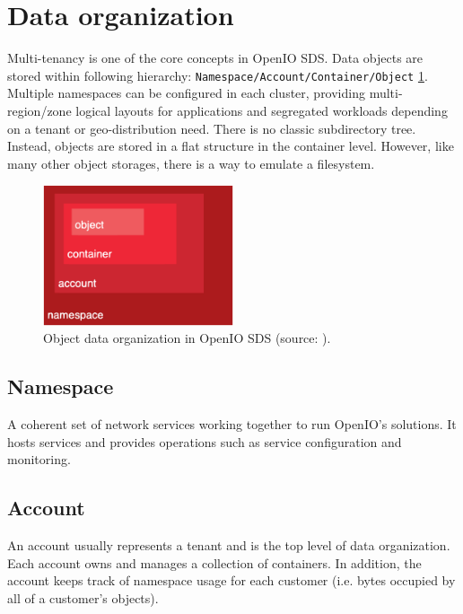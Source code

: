     \section{Data organization}
    Multi-tenancy is one of the core concepts in OpenIO SDS. Data objects are stored within following hierarchy: \texttt{Namespace/Account/Container/Object} \ref{fig:oioDataOrganization}. Multiple namespaces can be configured in each cluster, providing multi-region/zone logical layouts for applications and segregated workloads depending on a tenant or geo-distribution need\cite{oioSdsConcepts}.
    There is no classic subdirectory tree. Instead, objects are stored in a flat structure in the container level. However, like many other object storages, there is a way to emulate a filesystem.

    \begin{figure}[H]
        \centering
        \includegraphics[width=0.5\textwidth]{obrazky-figures/openio-data-organization.eps}
        \caption{Object data organization in OpenIO SDS (source: \cite{oioCoreSolution}).}
        \label{fig:oioDataOrganization}
    \end{figure}

    \subsection{Namespace}
    A coherent set of network services working together to run OpenIO's solutions. It hosts services and provides operations such as service configuration and monitoring.

    \subsection{Account}
    An account usually represents a tenant and is the top level of data organization. Each account owns and manages a collection of containers. In addition, the account keeps track of namespace usage for each customer (i.e. bytes occupied by all of a customer's objects)\cite{oioCoreSolution}.

